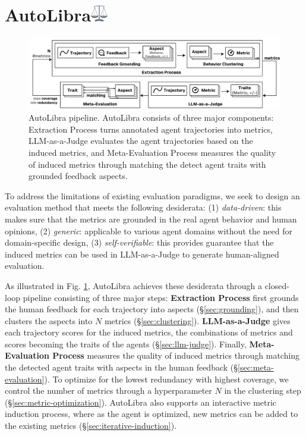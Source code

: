 \section{AutoLibra\protect\includegraphics[height=1em]{figs/scale.png}}

\begin{figure}[!t]
    \centering
    \includegraphics[width=\textwidth]{figs/autolibra-pipeline.pdf}
    \caption{AutoLibra pipeline. AutoLibra consists of three major components: Extraction Process
    turns annotated agent trajectories into metrics, LLM-as-a-Judge evaluates the agent trajectories
    based on the induced metrics, and Meta-Evaluation Process measures the quality of induced metrics
    through matching the detect agent traits with grounded feedback aspects.
    }
    \label{fig:autolibra-pipeline}
\end{figure}

To address the limitations of existing evaluation paradigms, we seek to design an evaluation method that 
meets the following desiderata: (1) \emph{data-driven}: this makes sure that the metrics are grounded
in the real agent behavior and human opinions, (2) \emph{generic}: applicable to various agent domains 
without the need for domain-specific design, (3) \emph{self-verifiable}: this provides guarantee that the 
induced metrics can be used in LLM-as-a-Judge to generate human-aligned evaluation. 

As illustrated in Fig. \ref{fig:autolibra-pipeline}, AutoLibra achieves these desiderata through a closed-loop pipeline
consisting of three major steps: \textbf{Extraction Process} first grounds the human feedback
for each trajectory into aspects (\S\ref{sec:grounding}), and then clusters the aspects into $N$ metrics (\S\ref{sec:clustering}).
\textbf{LLM-as-a-Judge} gives each trajectory scores for the induced metrics, the combinations of
metrics and scores becoming the traits of the agents (\S\ref{sec:llm-judge}).
Finally, \textbf{Meta-Evaluation Process} measures the quality of induced metrics through matching
the detected agent traits with aspects in the human feedback (\S\ref{sec:meta-evaluation}).
To optimize for the lowest redundancy with highest coverage, we control the number of metrics 
through a hyperparameter $N$ in the clustering step (\S\ref{sec:metric-optimization}). AutoLibra also supports
an interactive metric induction process, where as the agent is optimized, new metrics can be added
to the existing metrics (\S\ref{sec:iterative-induction}).

